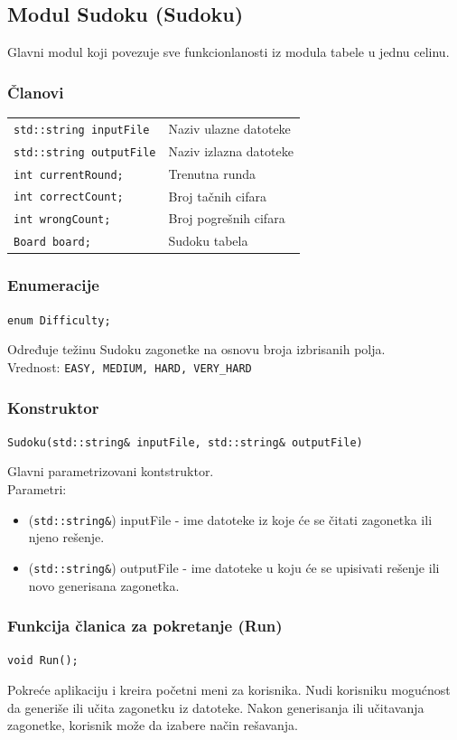 \documentclass[a4paper]{article}
\begin{document}
    \subsection{Modul Sudoku (Sudoku)}
    Glavni modul koji povezuje sve funkcionlanosti iz modula tabele u jednu celinu.
    \subsubsection{Članovi}
    \begin{tabular}{ l l }
        \texttt{std::string inputFile} & Naziv ulazne datoteke\\
        \texttt{std::string outputFile} & Naziv izlazna datoteke\\
        \texttt{int currentRound;} & Trenutna runda\\
        \texttt{int correctCount;} & Broj tačnih cifara\\
        \texttt{int wrongCount;} & Broj pogrešnih cifara\\
        \texttt{Board board;} & Sudoku tabela\\
    \end{tabular}
    
    \subsubsection{Enumeracije}
    \texttt{enum Difficulty;}
    \par Određuje težinu Sudoku zagonetke na osnovu broja izbrisanih polja. \\ 
    Vrednost: \texttt{EASY, MEDIUM, HARD, VERY\_HARD}

    \subsubsection{Konstruktor}
    \texttt{Sudoku(std::string\& inputFile, std::string\& outputFile)}
    \par Glavni parametrizovani kontstruktor.\\
    Parametri:
    \begin{itemize}
        \item (\texttt{std::string\&}) inputFile - ime datoteke iz koje će se čitati zagonetka ili njeno rešenje.
        \item (\texttt{std::string\&}) outputFile - ime datoteke u koju će se upisivati rešenje ili novo generisana zagonetka.
    \end{itemize}

    \subsubsection{Funkcija članica za pokretanje (Run)}
    \texttt{void Run();}
    \par Pokreće aplikaciju i kreira početni meni za korisnika. Nudi korisniku mogu\-ćnost da generiše 
    ili učita zagonetku iz datoteke. Nakon generisanja ili učitavanja zagonetke, korisnik može da izabere način rešavanja.
\end{document}
